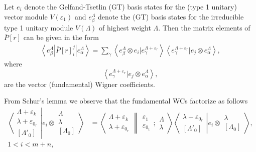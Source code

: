 \documentclass[12pt]{article}
\def\nn{\nonumber}
\begin{document}
Let $e_i$ denote the Gelfand-Tsetlin (GT) basis states for the (type 1 unitary) vector module $V(\varepsilon_1)$ and ${e^\Lambda_\beta}$ denote the (GT) basis states for the irreducible type 1 unitary module $V(\Lambda)$ of highest weight $\Lambda$. Then the matrix elements of $\bar{P}[r]$ can be given in the form
\begin{align}
\left\langle e^\Lambda_\beta | \bar{P}[r]^j_i | e^{\Lambda}_\alpha \right\rangle =
\sum_\gamma \left\langle e^\Lambda_\beta \otimes e_i | e^{\Lambda + \varepsilon_r}_\gamma \right\rangle
\left\langle e^{\Lambda+\varepsilon_r}_\gamma | e_j \otimes e^\Lambda_\alpha \right\rangle, \label{BarPij}
\end{align}
where
$$
\left\langle e^{\Lambda+\varepsilon_r}_\gamma | e_j \otimes e^\Lambda_\alpha \right\rangle,
$$
are the vector (fundamental) Wigner coefficients.

From Schur's lemma we observe that the fundamental WCs factorize as follows
\begin{align}
\left\langle\left. 
\begin{array}{c} \Lambda+\varepsilon_k\\ \lambda+\varepsilon_{0_r} \\ {[\Lambda'_0]} \end{array}
\right|\right.
\left.
e_i\otimes \begin{array}{c} \Lambda \\ \lambda \\
{[\Lambda_0]} \end{array}
\right\rangle &= 
\left\langle \left.
\begin{array}{c} \Lambda+\varepsilon_k\\ \lambda+\varepsilon_{0_r} 
 \end{array}
\right\rVert
\begin{array}{c} \varepsilon_1 \\ \varepsilon_{0_1} 
 \end{array}
; \begin{array}{c} \Lambda \\ \lambda
 \end{array}
\right\rangle 
\left\langle\left. 
\begin{array}{c} \lambda+\varepsilon_{0_r} \\ {[\Lambda'_0]} \end{array}
\right|\right.
\left.
e_i\otimes \begin{array}{c} \lambda \\
{[\Lambda_0]} \end{array}
\right\rangle,\label{Schur1}\\ 
1 < i < m+n, \nn
\end{align}
\end{document}
